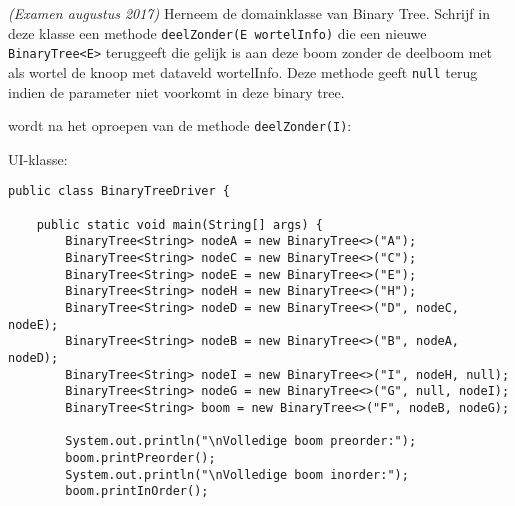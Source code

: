 \begin{oef}
\code \emph{(Examen augustus 2017)} Herneem de domainklasse van Binary Tree. Schrijf in deze klasse een methode \verb/deelZonder(E wortelInfo)/ die een nieuwe \verb+BinaryTree<E>+ teruggeeft die gelijk is aan deze boom zonder de deelboom met als wortel de knoop met dataveld wortelInfo. Deze methode geeft \verb+null+ terug indien de parameter niet voorkomt in deze binary tree.

\begin{figure}[htbp]
    \centering
{}
\end{figure}

wordt na het oproepen van de methode \verb+deelZonder(I)+:
\begin{figure}[htbp]
    \centering
{}
\end{figure}

UI-klasse:
\begin{lstlisting}
public class BinaryTreeDriver {

    public static void main(String[] args) {
        BinaryTree<String> nodeA = new BinaryTree<>("A");
        BinaryTree<String> nodeC = new BinaryTree<>("C");
        BinaryTree<String> nodeE = new BinaryTree<>("E");
        BinaryTree<String> nodeH = new BinaryTree<>("H");
        BinaryTree<String> nodeD = new BinaryTree<>("D", nodeC, nodeE);
        BinaryTree<String> nodeB = new BinaryTree<>("B", nodeA, nodeD);
        BinaryTree<String> nodeI = new BinaryTree<>("I", nodeH, null);
        BinaryTree<String> nodeG = new BinaryTree<>("G", null, nodeI);
        BinaryTree<String> boom = new BinaryTree<>("F", nodeB, nodeG);

        System.out.println("\nVolledige boom preorder:");
        boom.printPreorder();
        System.out.println("\nVolledige boom inorder:");
        boom.printInOrder();


\end{lstlisting}
\end{oef}
